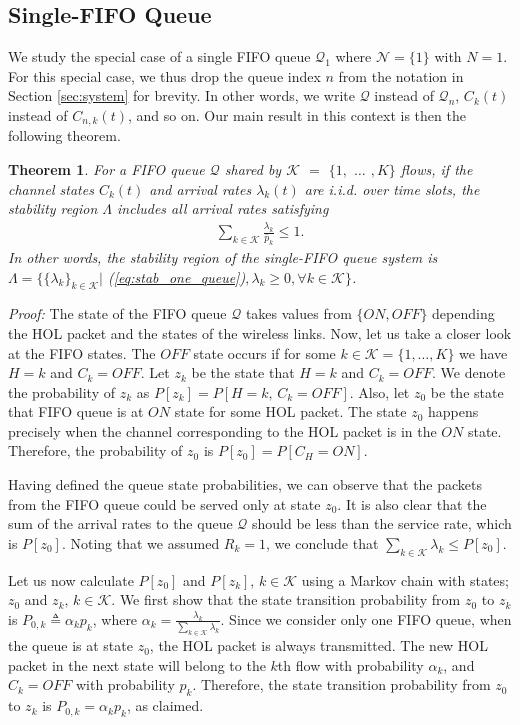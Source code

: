 \documentclass[conference]{IEEEtran}
\newtheorem{theorem}{Theorem}
\newcommand{\Kset}{\mathcal{K}}
\newcommand{\Qset}{\mathcal{Q}}
\begin{document}
\subsection{Single-FIFO Queue} \label{sec:stability_single_queue}
We study the special case of a single FIFO queue $\mathcal{Q}_1$ where $\mathcal{N} = \{1\}$ with $N=1$. For this special case, we thus drop the queue index $n$ from the notation in Section \ref{sec:system} for brevity. In other words, we write $\mathcal{Q}$ instead of $\mathcal{Q}_n$, $C_{k}(t)$ instead of $C_{n,k}(t)$, and so on. Our main result in this context is then the following theorem.
\begin{theorem}\label{theorem1}
For a FIFO queue $\Qset$ shared by $\Kset$ $=$ $\{1,$ $\ldots$ $,K\}$ flows, if the channel states $C_{k}(t)$ and arrival rates $\lambda_{k}(t)$ are i.i.d. over time slots, the stability region $\Lambda$ includes all arrival rates satisfying
\begin{align} \label{eq:stab_one_queue}
\sum_{k \in \Kset} \frac{\lambda_{k}}{\bar{p}_{k}} \leq 1.
\end{align} In other words, the stability region of the single-FIFO queue system is $\Lambda = \{ \{\lambda_{k}\}_{k \in \Kset} |$ (\ref{eq:stab_one_queue})$, \lambda_{k} \geq 0, \forall k \in \Kset\}$.
\end{theorem}
{\em Proof:} The state of the FIFO queue $\Qset$ takes values from $\{ON,OFF\}$ depending the HOL packet and the states of the wireless links. Now, let us take a closer look at the FIFO states. The $OFF$ state occurs if for some $k\in\mathcal{K}=\{1,\ldots,K\}$ we have $H = k$ and $C_{k} = OFF$. Let $z_k$ be the state that $H = k$ and $C_{k} = OFF$. We denote the probability of $z_k$ as $P[z_k] = P[H=k,\,C_k = OFF]$. Also, let $z_0$ be the state that FIFO queue is at $ON$ state for some HOL packet. The state $z_0$ happens precisely when the channel corresponding to the HOL packet is in the $ON$ state. Therefore, the probability of $z_0$ is $P[z_0] = P [C_H = ON]$.


Having defined the queue state probabilities, we can observe that the packets from the FIFO queue could be served only at state $z_0$. It is also clear that the sum of the arrival rates to the queue $\Qset$ should be less than the service rate, which is $P[z_0]$. Noting that we assumed $R_{k}=1$, we conclude that $\sum_{k \in \Kset} \lambda_{k} \leq P[z_0]$.

Let us now calculate $P[z_0]$ and $P[z_k],\,k \in \Kset$ using a Markov chain with states; $z_0$ and $z_k,\,k \in \Kset$. We first show that the state transition probability from $z_0$ to $z_k$ is $P_{0,k} \triangleq \alpha_{k} p_{k}$, where $\alpha_k = \frac{\lambda_{k}}{\sum_{k \in \Kset} \lambda_{k}}$. Since we consider only one FIFO queue, when the queue is at state $z_0$, the HOL packet is always transmitted. The new HOL packet in the next state will belong to the $k$th flow with probability $\alpha_{k}$, and $C_{k} = OFF$ with probability $p_{k}$. Therefore, the state transition probability from $z_0$ to $z_k$ is $P_{0,k} = \alpha_{k} p_{k}$, as claimed.
\end{document}
